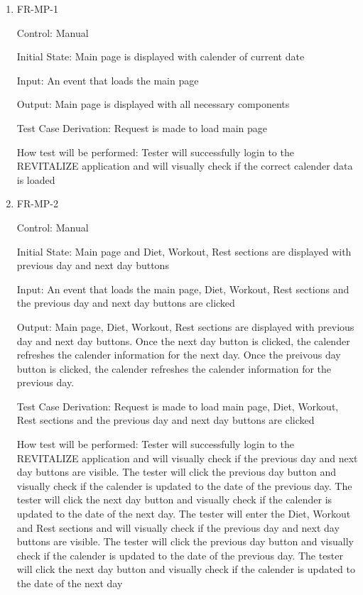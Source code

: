 \documentclass[12pt, titlepage]{article}
\begin{document}
\begin{enumerate}
	
	\item{FR-MP-1\\}
	
	Control: Manual
	
	Initial State: Main page is displayed with calender of current date
	
	Input: An event that loads the main page
	
	Output: Main page is displayed with all necessary components
	
	Test Case Derivation: Request is made to load main page
	
	How test will be performed: Tester will successfully login to the REVITALIZE application and will visually check if the correct calender data is loaded
	
	\item{FR-MP-2\\}
	
	Control: Manual
	
	Initial State: Main page and Diet, Workout, Rest sections are displayed with previous day and next day buttons
	
	Input: An event that loads the main page, Diet, Workout, Rest sections and the previous day and next day  buttons are clicked
	
	Output: Main page, Diet, Workout, Rest sections are displayed with previous day and next day buttons. Once the next day button is clicked, the calender refreshes  the calender information for the next day. Once the preivous day button is clicked, the calender refreshes the calender information for the previous day.
	
	Test Case Derivation: Request is made to load main page, Diet, Workout, Rest sections and the previous day and next day buttons are clicked
	
	How test will be performed: Tester will successfully login to the REVITALIZE application and will visually check if the previous day and next day buttons are visible. The tester will click the previous day button and visually check if the calender is updated to the date of the previous day. The tester will click the next day button and visually check if the calender is updated to the date of the next day. The tester will enter the Diet, Workout and Rest sections and will visually check if the previous day and next day buttons are visible. The tester will click the previous day button and visually check if the calender is updated to the date of the previous day. The tester will click the next day button and visually check if the calender is updated to the date of the next day
	

\end{enumerate}
\end{document}
